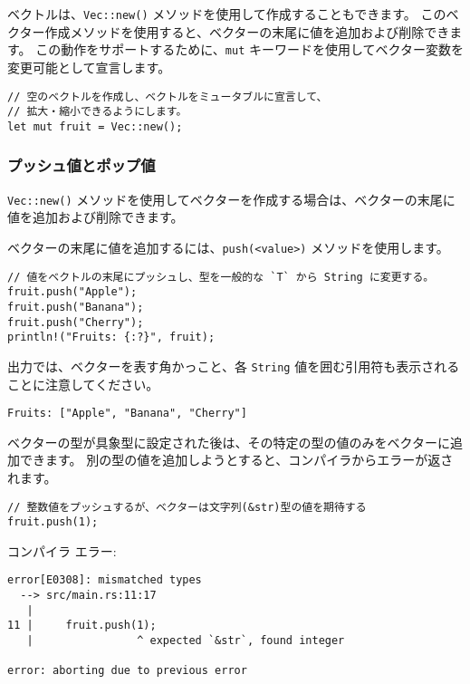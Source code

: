 ベクトルは、\texttt{Vec::new()} メソッドを使用して作成することもできます。 このベクター作成メソッドを使用すると、ベクターの末尾に値を追加および削除できます。 この動作をサポートするために、\texttt{mut} キーワードを使用してベクター変数を変更可能として宣言します。


\begin{lstlisting}[numbers=none]
// 空のベクトルを作成し、ベクトルをミュータブルに宣言して、
// 拡大・縮小できるようにします。
let mut fruit = Vec::new();
\end{lstlisting}

\subsubsection{プッシュ値とポップ値}

\texttt{Vec::new()} メソッドを使用してベクターを作成する場合は、ベクターの末尾に値を追加および削除できます。

ベクターの末尾に値を追加するには、\texttt{push(<value>)} メソッドを使用します。

\begin{lstlisting}[numbers=none]
// 値をベクトルの末尾にプッシュし、型を一般的な `T` から String に変更する。
fruit.push("Apple");
fruit.push("Banana");
fruit.push("Cherry");
println!("Fruits: {:?}", fruit); 
\end{lstlisting}

出力では、ベクターを表す角かっこと、各 \texttt{String} 値を囲む引用符も表示されることに注意してください。

\begin{lstlisting}[numbers=none]
Fruits: ["Apple", "Banana", "Cherry"]
\end{lstlisting}

ベクターの型が具象型に設定された後は、その特定の型の値のみをベクターに追加できます。 別の型の値を追加しようとすると、コンパイラからエラーが返されます。

\begin{lstlisting}[numbers=none]
// 整数値をプッシュするが、ベクターは文字列(&str)型の値を期待する
fruit.push(1);
\end{lstlisting}

コンパイラ エラー:

\begin{lstlisting}[numbers=none]
error[E0308]: mismatched types
  --> src/main.rs:11:17
   |
11 |     fruit.push(1);
   |                ^ expected `&str`, found integer

error: aborting due to previous error
\end{lstlisting}

